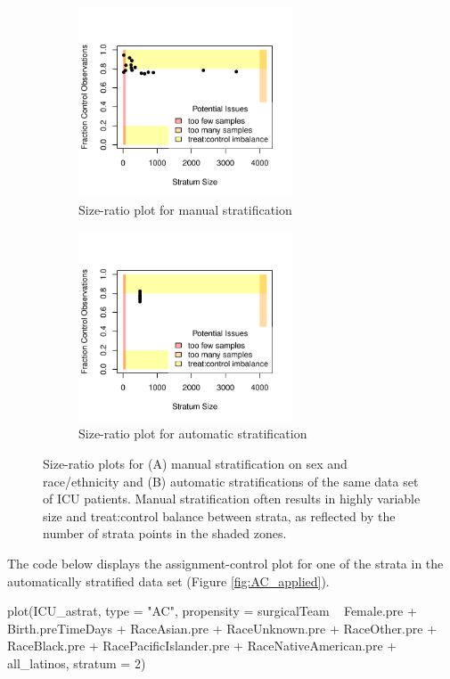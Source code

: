 \begin{figure}[t!]
\centering
    \begin{subfigure}[t]{2.5in}
        \centering
        \includegraphics[width = 2.5in]{Figure3a.pdf}
        \caption{Size-ratio plot for manual stratification}
    \end{subfigure}
    \begin{subfigure}[t]{2.5in}
        \centering
        \includegraphics[width = 2.5in]{Figure3b.pdf}
        \caption{Size-ratio plot for automatic stratification}
    \end{subfigure}
\caption{ Size-ratio plots for (A) manual stratification on sex and race/ethnicity and (B) automatic stratifications of the same data set of ICU patients. Manual stratification often results in highly variable size and treat:control balance between strata, as reflected by the number of strata points in the shaded zones.}
\label{fig:SR_applied}
\end{figure}

The code below displays the assignment-control plot for one of the strata in the automatically stratified data set (Figure \ref{fig:AC_applied}). 

\begin{example}
plot(ICU_astrat, type = "AC",
    propensity = surgicalTeam ~ Female.pre + Birth.preTimeDays +
      RaceAsian.pre + RaceUnknown.pre + RaceOther.pre + RaceBlack.pre +
      RacePacificIslander.pre + RaceNativeAmerican.pre + all_latinos,
    stratum = 2)
\end{example}

